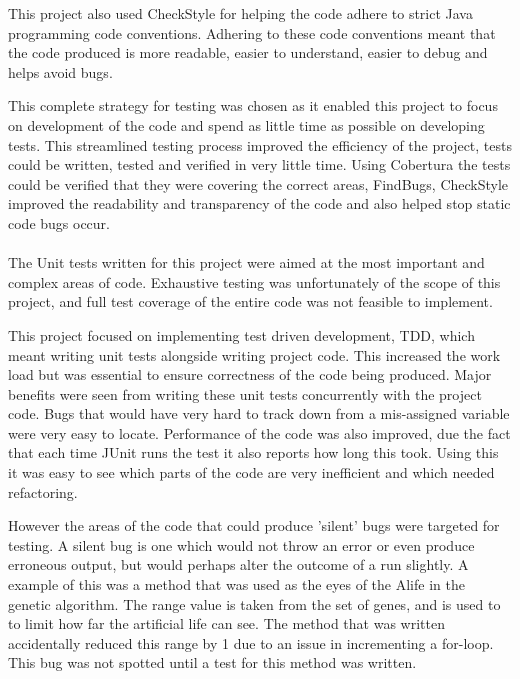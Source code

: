 \documentclass[12pt]{article}
\begin{document}
This project also used
CheckStyle for helping the code adhere to strict Java programming code conventions. Adhering to these code conventions meant that
the code produced is more readable, easier to understand, easier to debug and helps avoid bugs.

This complete strategy for testing was chosen as it enabled this project to focus on development of the code and spend as little
time as possible on developing tests. This streamlined testing process improved the efficiency of the project, tests could 
be written, tested and verified in very little time. Using Cobertura the tests could be verified that they were covering the
correct areas, FindBugs, CheckStyle improved the readability and transparency of the code and also helped stop static code
bugs occur.


\paragraph{}

The Unit tests written for this project were aimed at the most important and complex areas of code. Exhaustive testing was 
unfortunately of the scope of this project, and full test coverage of the entire code was not feasible to implement.

This project focused on implementing test driven development, TDD, which meant writing unit tests alongside writing project code.
This increased the work load but was essential to ensure correctness of the code being produced. Major benefits were seen from
writing these unit tests concurrently with the project code. Bugs that would have very hard to track down from a mis-assigned
variable were very easy to locate. Performance of the code was also improved, due the fact that each time JUnit runs the test
it also reports how long this took. Using this it was easy to see which parts of the code are very inefficient and which needed
refactoring. 

However the 
areas of the code that could produce 'silent' bugs were targeted for testing. A silent bug is one which would not throw an error
or even produce erroneous output, but would perhaps alter the outcome of a run slightly. A example of this was a method that
was used as the eyes of the Alife in the genetic algorithm. The range value is taken from the set of genes, and is used to 
to limit how far the artificial life can see. The method that was written accidentally reduced this range by 1 due to an issue
in incrementing a for-loop. This bug was not spotted until a test for this method was written. 
\end{document}
